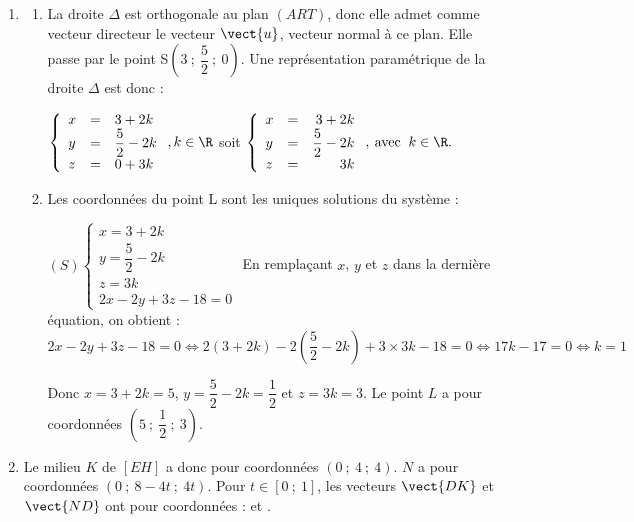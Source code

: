 \begin{enumerate}
\begin{enumerate}
		Donc $\vect{n}\perp\vect{AR}$ et $\vect{n}\perp\vect{AT}$ donc $\vect{n}$ est normal à tout vecteur du plan $(ART)$, donc $\vect{n}$ est un vecteur normal au plan $(ART)$.
		\item Le plan $(ART)$ a pour équation cartésienne : $ax+by+cz+d = 0$, où $(a~;~b~;~c)$ sont les cordonnées d'un vecteur normal au plan. En prenant comme vecteur normal le vecteur $\vect{n}$, on obtient : $(ART)$ : $2x - 2y + 3z + d = 0$. 
				
Or $A\in \text{(ART)}$ donc $12-0+6+d=0$ donc $d=-18$.

Donc le plan $(ART)$ a pour équation $2x - 2y + 3z - 18 = 0$.
	\end{enumerate}
	\item 
	\begin{enumerate}
		\item La droite $\Delta$ est orthogonale au plan $(ART)$, donc elle admet comme vecteur directeur le vecteur $\vect{u}$, vecteur normal à ce plan. Elle passe par le point S$\left(3~;~\dfrac52~;~0\right)$. Une représentation paramétrique de la droite $\Delta$ est donc : 

		$\left\{\begin{array}{l c l}	x&=&3+2k\\y &=&\dfrac52-2k\\z&=&0+3k			\end{array}\right. , k \in \R$ soit 
		$\left\{\begin{array}{l c r}x&=&3+2k\\y&=& \dfrac52 - 2k\\z &=& 3k \end{array}\right.,\: \text{avec }\:k \in \R.$
		\item Les coordonnées du point L sont les uniques solutions du système :
		
$(S) \left\{\begin{array}{l}	x = 3 + 2k\\y =\dfrac52-2k\\z=3k\\2x - 2y + 3z - 18=0			\end{array}\right.$
		En remplaçant $x$, $y$ et $z$ dans la dernière équation, on obtient : 
$2x - 2y + 3z - 18=0 \iff 2(3+2k)-2\left(\dfrac52-2k\right)+3\times 3k-18=0 \iff 17k-17=0 \iff k=1$
		
Donc $x=3+2k=5$, $y =\dfrac52-2k=\dfrac12$ et $z=3k=3$.
Le point $L$ a pour coordonnées $\left(5~;~\dfrac12~;~3\right)$.
	\end{enumerate}
	\item Le milieu $K$ de $[EH]$ a donc pour coordonnées $\left(0~;~4~;~4\right)$. $N$ a pour coordonnées $(0~;~8 - 4t~;~4t)$. Pour $t\in [0~;~1]$, les vecteurs $\vect{DK}$ et $\vect{ND}$ ont pour coordonnées  :  et .
	

\end{enumerate}

